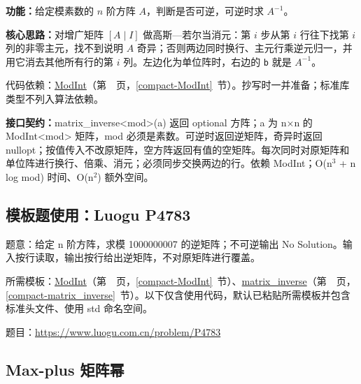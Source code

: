 \noindent\textbf{功能：}\allowbreak 给定模素数的 $n$ 阶方阵 $A$，判断是否可逆，可逆时求 $A^{-1}$。

\textbf{核心思路：}\allowbreak 对增广矩阵 $[A\mid I]$ 做高斯—若尔当消元：第 $i$ 步从第 $i$ 行往下找第 $i$ 列的非零主元，找不到说明 $A$ 奇异；否则两边同时换行、主元行乘逆元归一，并用它消去其他所有行的第 $i$ 列。左边化为单位阵时，右边的 \texttt{b} 就是 $A^{-1}$。

代码依赖：\hyperref[compact-ModInt]{ModInt}（第~\pageref{compact-ModInt}~页，\ref{compact-ModInt}~节）。抄写时一并准备；标准库类型不列入算法依赖。

{\sloppy{}\noindent\textbf{接口契约：}matrix\_inverse<mod>(a) 返回 optional 方阵；a 为 n×n 的 ModInt<mod> 矩阵，mod 必须是素数。可逆时返回逆矩阵，奇异时返回 nullopt；按值传入不改原矩阵，空方阵返回有值的空矩阵。每次同时对原矩阵和单位阵进行换行、倍乘、消元；必须同步交换两边的行。依赖 ModInt；O(n$^{3}$ + n log mod) 时间、O(n$^{2}$) 额外空间。\par}



\Needspace{417pt}

\subsection*{模板题使用：Luogu P4783}

\label{usage-example-100}

题意：给定 n 阶方阵，求模 1000000007 的逆矩阵；不可逆输出 No Solution。输入按行读取，输出按行给出逆矩阵，不对原矩阵进行覆盖。

所需模板：\hyperref[compact-ModInt]{ModInt}（第~\pageref{compact-ModInt}~页，\ref{compact-ModInt}~节）、\hyperref[compact-matrix_inverse]{matrix\_\allowbreak{}inverse}（第~\pageref{compact-matrix_inverse}~页，\ref{compact-matrix_inverse}~节）。以下仅含使用代码，默认已粘贴所需模板并包含标准头文件、使用 std 命名空间。

题目：\url{https://www.luogu.com.cn/problem/P4783}



\newpage

\Needspace{552pt}

\subsection{Max-plus 矩阵幂}\label{compact-MaxPlusMatrix}


